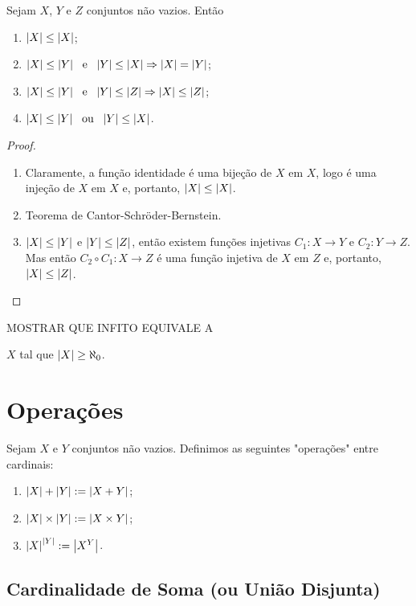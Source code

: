 \begin{prop}
	Sejam $X$, $Y$ e $Z$ conjuntos não vazios. Então
	\begin{enumerate}
	\item $\left\vert{X}\right\vert \leq \left\vert{X}\right\vert$;
	\item $\left\vert{X}\right\vert \leq \left\vert{Y}\right\vert \text{\ \ e\ \ }  \left\vert{Y}\right\vert \leq \left\vert{X}\right\vert \Rightarrow \left\vert{X}\right\vert = \left\vert{Y}\right\vert$;
	\item $\left\vert{X}\right\vert \leq \left\vert{Y}\right\vert \text{\ \ e\ \ } \left\vert{Y}\right\vert \leq \left\vert{Z}\right\vert \Rightarrow \left\vert{X}\right\vert \leq \left\vert{Z}\right\vert$;
	\item $\left\vert{X}\right\vert \leq \left\vert{Y}\right\vert \text{\ \ ou\ \ } \left\vert{Y}\right\vert \leq \left\vert{X}\right\vert$.
	\end{enumerate}
\end{prop}
\begin{proof}
	\begin{enumerate}
	\item Claramente, a função identidade é uma bijeção de $X$ em $X$, logo é uma injeção de $X$ em $X$ e, portanto, $\left\vert{X}\right\vert \leq \left\vert{X}\right\vert$.
	\item Teorema de Cantor-Schröder-Bernstein.
	\item $\left\vert{X}\right\vert \leq \left\vert{Y}\right\vert$ e $\left\vert{Y}\right\vert \leq \left\vert{Z}\right\vert$, então existem funções injetivas $C_1:X \to Y$ e $C_2: Y \to Z$. Mas então $C_2 \circ C_1: X \to Z$ é uma função injetiva de $X$ em $Z$ e, portanto, $\left\vert{X}\right\vert \leq \left\vert{Z}\right\vert$.
	\end{enumerate}
\end{proof}


	MOSTRAR QUE INFITO EQUIVALE A

$X$ tal que $\left\vert{X}\right\vert \geq \aleph_0$.

\section{Operações}

\begin{defi}
	Sejam $X$ e $Y$ conjuntos não vazios. Definimos as seguintes "operações" entre cardinais:
	\begin{enumerate}
	\item $\left\vert{X}\right\vert + \left\vert{Y}\right\vert := \left\vert{X + Y}\right\vert$;
	\item $\left\vert{X}\right\vert \times \left\vert{Y}\right\vert := \left\vert{X \times Y}\right\vert$;
	\item $\left\vert{X}\right\vert^{\left\vert{Y}\right\vert} := \left\vert{X^Y}\right\vert$.
	\end{enumerate}
\end{defi}

\subsection{Cardinalidade de Soma (ou União Disjunta)}

